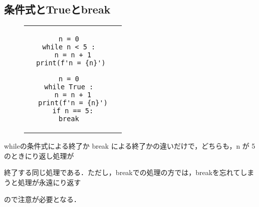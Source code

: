 \documentclass{jsarticle}
\begin{document}
\subsection{条件式とTrueとbreak}
\begin{figure}[h]
	\begin{tabular}{cc}
		\begin{minipage}[c]{.45\textwidth}
			\begin{lstlisting}[caption=条件式による繰り返しの終了]
n = 0
while n < 5 :
  n = n + 1
  print(f'n = {n}') \end{lstlisting}
		\end{minipage} \hspace{3mm}
		\begin{minipage}[c]{.55\textwidth}
			\begin{lstlisting}[caption=break による繰り返しの終了]
n = 0
while True :
  n = n + 1
  print(f'n = {n}')
  if n == 5:
    break    \end{lstlisting}
		\end{minipage}
	\end{tabular}
\end{figure}
\begin{screen}
	whileの条件式による終了か break による終了かの違いだけで，どちらも，n が 5 のときにり返し処理が \par
	終了する同じ処理である．ただし，breakでの処理の方では，breakを忘れてしまうと処理が永遠にり返す\par
	ので注意が必要となる．
\end{screen}
\newpage
\end{document}
